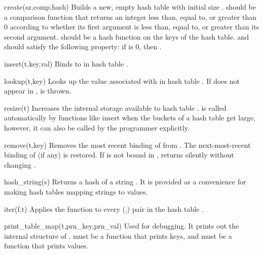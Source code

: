 \begin{defun}{create}{(sz,comp,hash)}
Builds a new, empty hash table with initial size .  
should be a comparison function that returns an integer less than, equal
to, or greater than 0 according to whether its first argument is less
than, equal to, or greater than its second argument.   should
be a hash function on the keys of the hash table.   and
 should satisfy the following property: if
 is 0, then .
\end{defun}

\begin{defun}{insert}{(t,key,val)}
Binds  to  in hash table .
\end{defun}

\begin{defun}{lookup}{(t,key)}
Looks up the value associated with  in hash table .  If
 does not appear in ,  is thrown.
\end{defun}


\begin{defun}{resize}{(t)}
Increases the internal storage available to hash table .
 is called automatically by functions like insert when the
buckets of a hash table get large, however, it can also be called by the
programmer explicitly.
\end{defun}

\begin{defun}{remove}{(t,key)}
Removes the most recent binding of  from .  The
next-most-recent binding of  (if any) is restored.  If
 is not bound in ,  returns silently
without changing .
\end{defun}


\begin{defun}{hash_string}{(s)}
Returns a hash of a string .  It is provided as a convenience for
making hash tables mapping strings to values.
\end{defun}

\begin{defun}{iter}{(f,t)}
Applies the function  to every (,) pair in
the hash table .
\end{defun}

\begin{defun}{print_table_map}{(t,prn_key,prn_val)}
Used for debugging.  It prints out the internal structure of .
 must be a function that prints keys, and 
must be a function that prints values.
\end{defun}

